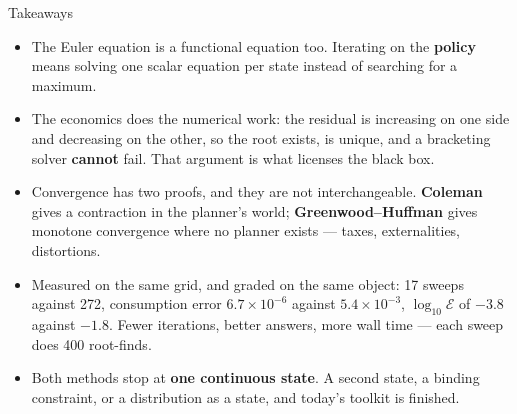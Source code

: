 \begin{frame}{Takeaways}
\begin{takeawaybox}
\begin{itemize}\small
  \item The Euler equation is a functional equation too. Iterating on the \textbf{policy} means solving one scalar equation per state instead of searching for a maximum.
  \item The economics does the numerical work: the residual is increasing on one side and decreasing on the other, so the root exists, is unique, and a bracketing solver \textbf{cannot} fail. That argument is what licenses the black box.
  \item Convergence has two proofs, and they are not interchangeable. \textbf{Coleman} gives a contraction in the planner's world; \textbf{Greenwood--Huffman} gives monotone convergence where no planner exists --- taxes, externalities, distortions.
  \item Measured on the same grid, and graded on the same object: 17 sweeps against 272, consumption error $6.7\times10^{-6}$ against $5.4\times10^{-3}$, $\log_{10}\mathcal{E}$ of $-3.8$ against $-1.8$. Fewer iterations, better answers, more wall time --- each sweep does 400 root-finds.
  \item Both methods stop at \textbf{one continuous state}. A second state, a binding constraint, or a distribution as a state, and today's toolkit is finished.
\end{itemize}
\end{takeawaybox}
\end{frame}

